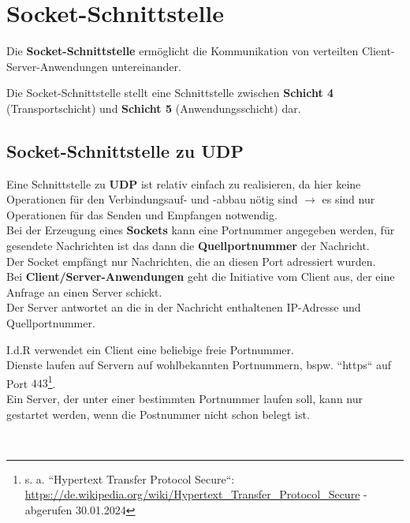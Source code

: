 \section{Socket-Schnittstelle}

Die \textbf{Socket-Schnittstelle} ermöglicht die Kommunikation von verteilten Client-Server-Anwendungen untereinander.\\

\begin{tcolorbox}
Die Socket-Schnittstelle stellt eine Schnittstelle zwischen \textbf{Schicht 4} (Transportschicht) und \textbf{Schicht 5} (Anwendungsschicht) dar.
\end{tcolorbox}

\subsection{Socket-Schnittstelle zu UDP}

Eine Schnittstelle zu \textbf{UDP} ist relativ einfach zu realisieren, da hier keine Operationen für den Verbindungsauf- und -abbau nötig sind $\rightarrow$ es sind nur Operationen für das Senden und Empfangen notwendig.\\

\noindent
Bei der Erzeugung eines \textbf{Sockets} kann eine Portnummer angegeben werden, für gesendete Nachrichten ist das dann die \textbf{Quellportnummer} der Nachricht.\\
Der Socket empfängt nur Nachrichten, die an diesen Port adressiert wurden.\\

\noindent
Bei \textbf{Client/Server-Anwendungen} geht die Initiative vom Client aus, der eine Anfrage an einen Server schickt.\\
Der Server antwortet an die in der Nachricht enthaltenen IP-Adresse und Quellportnummer.

\begin{tcolorbox}
I.d.R verwendet ein Client eine beliebige freie Portnummer.\\

\noindent
Dienste laufen auf Servern auf wohlbekannten Portnummern, bspw. ``https`` auf Port $443$\footnote{
s. a. ``Hypertext Transfer Protocol Secure``: \url{https://de.wikipedia.org/wiki/Hypertext_Transfer_Protocol_Secure} - abgerufen 30.01.2024
}.\\
Ein Server, der unter einer bestimmten Portnummer laufen soll, kann nur gestartet werden, wenn die Postnummer nicht schon belegt ist.
\end{tcolorbox}\\

